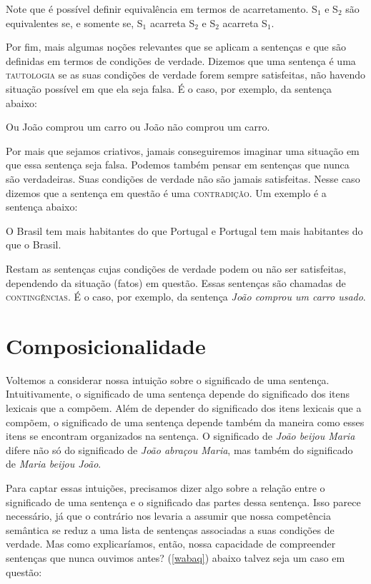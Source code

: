\n Note que é possível definir equivalência em termos de acarretamento. S$_{1}$ e S$_{2}$ são equivalentes se, e somente se, S$_{1}$ acarreta S$_{2}$ e S$_{2}$ acarreta S$_{1}$.

Por fim, mais algumas no\-çõ\-es relevantes que se aplicam a sen\-ten\-ças e que são definidas em termos de condi\-çõ\-es de verdade. Dizemos que uma sentença é uma \textsc{tautologia} se as suas condi\-çõ\-es de verdade forem sempre satisfeitas, não havendo situa\-ção possível em que ela seja falsa. É o caso, por exemplo, da sentença abaixo:

\begin{exe}
    \ex Ou João comprou um carro ou João não comprou
um carro. \label{tau}
\end{exe}

\n Por mais que sejamos criativos, jamais conseguiremos imaginar uma situa\-ção em que essa sentença seja falsa. Podemos também pensar em sen\-ten\-ças que nunca são verdadeiras. Suas condi\-çõ\-es de verdade não são jamais satisfeitas. Nesse caso dizemos que a sentença em questão é uma \textsc{contradi\-ção}. Um exemplo é a sentença abaixo:

\begin{exe}
    \ex O Brasil tem mais habitantes do que Portugal e Portugal tem mais habitantes do que o Brasil. \label{con}
\end{exe}

 \n Restam as sen\-ten\-ças cujas condi\-çõ\-es de verdade podem ou não ser satisfeitas,
dependendo da situa\-ção (fatos) em questão. Essas sen\-ten\-ças
são chamadas de \textsc{contingências}. É o caso, por exemplo, da
sentença \textit{João comprou um carro usado}.

\section{Composicionalidade}

Voltemos a considerar nossa intui\-ção sobre o significado de uma
sentença. Intuitivamente, o significado de uma sentença depende do
significado dos itens lexicais que a compõem. Além de depender do
significado dos itens lexicais que a compõem, o significado de uma
sentença depende também da maneira como esses itens se encontram
organizados na sentença. O significado de \textit{João beijou Maria}
difere não só do significado de \textit{João abraçou Maria}, mas também
do significado de \textit{Maria beijou João}.

Para captar essas intui\-çõ\-es, precisamos dizer algo sobre a
rela\-ção entre o significado de uma sentença e o significado das
partes dessa sentença. Isso parece necessário, já que o contrário
nos levaria a assumir que nossa competência semântica se reduz a
uma lista de sen\-ten\-ças associadas a suas condi\-çõ\-es de
verdade. Mas como explicaríamos, então, nossa capacidade de
compreender sen\-ten\-ças que nunca ouvimos antes? (\ref{wabaq})
abaixo talvez seja um caso em questão:


